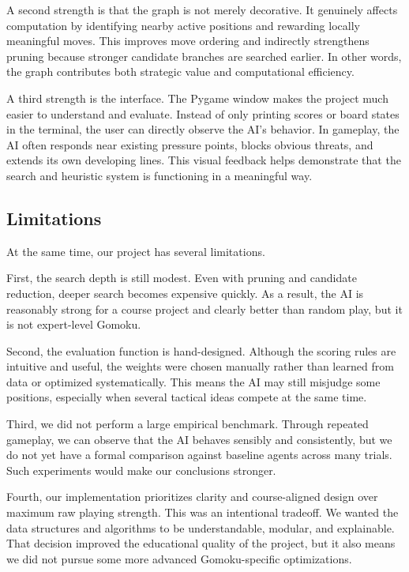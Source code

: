 \documentclass[11pt]{article}
\begin{document}
A second strength is that the graph is not merely decorative. It genuinely affects computation by identifying nearby active positions and rewarding locally meaningful moves. This improves move ordering and indirectly strengthens pruning because stronger candidate branches are searched earlier. In other words, the graph contributes both strategic value and computational efficiency.

A third strength is the interface. The Pygame window makes the project much easier to understand and evaluate. Instead of only printing scores or board states in the terminal, the user can directly observe the AI's behavior. In gameplay, the AI often responds near existing pressure points, blocks obvious threats, and extends its own developing lines. This visual feedback helps demonstrate that the search and heuristic system is functioning in a meaningful way.

\subsection*{Limitations}

At the same time, our project has several limitations.

First, the search depth is still modest. Even with pruning and candidate reduction, deeper search becomes expensive quickly. As a result, the AI is reasonably strong for a course project and clearly better than random play, but it is not expert-level Gomoku.

Second, the evaluation function is hand-designed. Although the scoring rules are intuitive and useful, the weights were chosen manually rather than learned from data or optimized systematically. This means the AI may still misjudge some positions, especially when several tactical ideas compete at the same time.

Third, we did not perform a large empirical benchmark. Through repeated gameplay, we can observe that the AI behaves sensibly and consistently, but we do not yet have a formal comparison against baseline agents across many trials. Such experiments would make our conclusions stronger.

Fourth, our implementation prioritizes clarity and course-aligned design over maximum raw playing strength. This was an intentional tradeoff. We wanted the data structures and algorithms to be understandable, modular, and explainable. That decision improved the educational quality of the project, but it also means we did not pursue some more advanced Gomoku-specific optimizations.
\end{document}
